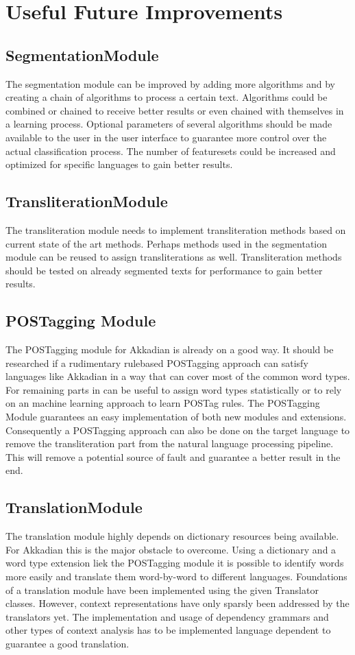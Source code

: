 \documentclass[10pt,a4paper,titlepage]{report}
\begin{document}
	\chapter{Useful Future Improvements}
	\section{SegmentationModule}
	The segmentation module can be improved by adding more algorithms and by creating a chain of algorithms to process a certain text. Algorithms could be combined or chained to receive better results or even chained with themselves in a learning process. Optional parameters of several algorithms should be made available to the user in the user interface to guarantee more control over the actual classification process. The number of featuresets could be increased and optimized for specific languages to gain better results.
	\section{TransliterationModule}
	The transliteration module needs to implement transliteration methods based on current state of the art methods. Perhaps methods used in the segmentation module can be reused to assign transliterations as well. Transliteration methods should be tested on already segmented texts for performance to gain better results.
	\section{POSTagging Module}
	The POSTagging module for Akkadian is already on a good way. It should be researched if a rudimentary rulebased POSTagging approach can satisfy languages like Akkadian in a way that can cover most of the common word types. For remaining parts in can be useful to assign word types statistically or to rely on an machine learning approach to learn POSTag rules. The POSTagging Module guarantees an easy implementation of both new modules and extensions. Consequently a POSTagging approach can also be done on the target language to remove the transliteration part from the natural language processing pipeline. This will remove a potential source of fault and guarantee a better result in the end.
	\section{TranslationModule}
	The translation module highly depends on dictionary resources being available. For Akkadian this is the major obstacle to overcome. Using a dictionary and a word type extension liek the POSTagging module it is possible to identify words more easily and translate them word-by-word to different languages. Foundations of a translation module have been implemented using the given Translator classes. However, context representations have only sparsly been addressed by the translators yet. The implementation and usage of dependency grammars and other types of context analysis has to be implemented language dependent to guarantee a good translation.
\end{document}

